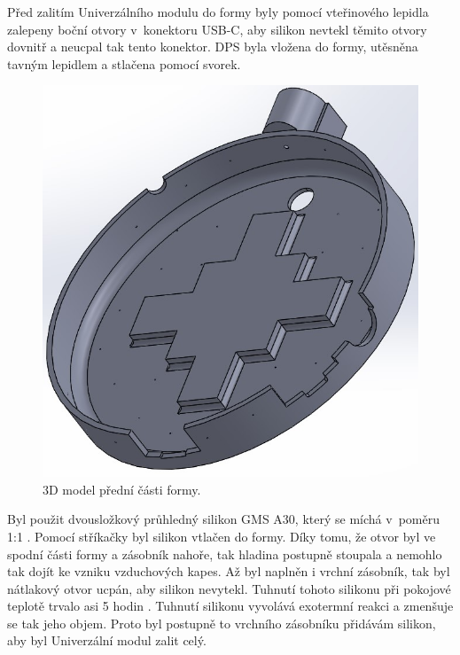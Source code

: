 Před zalitím Univerzálního modulu do formy byly pomocí vteřinového lepidla zalepeny boční otvory v~konektoru USB-C, aby silikon nevtekl těmito otvory dovnitř a neucpal tak tento konektor. DPS byla 
vložena do formy, utěsněna tavným lepidlem a stlačena pomocí svorek.

\begin{figure}[!h]
  \begin{center}
    \includegraphics[scale=0.4]{obrazky/forma_predni.jpg}
  \end{center}
  \caption[3D model přední části formy]{3D model přední části formy.}
\end{figure}

Byl použit dvousložkový průhledný silikon GMS A30, který se míchá v~poměru 1:1 \cite{silikon}. Pomocí stříkačky byl silikon vtlačen do formy. Díky tomu, že otvor byl ve spodní části formy a zásobník 
nahoře, tak hladina postupně stoupala a nemohlo tak dojít ke vzniku vzduchových kapes. Až byl naplněn i vrchní zásobník, tak byl nátlakový otvor ucpán, aby silikon nevytekl. Tuhnutí tohoto silikonu 
při pokojové teplotě trvalo asi 5 hodin \cite{silikon}. Tuhnutí silikonu vyvolává exotermní reakci a zmenšuje se tak jeho objem. Proto byl postupně to vrchního zásobníku přidávám silikon, aby byl 
Univerzální modul zalit celý. 


